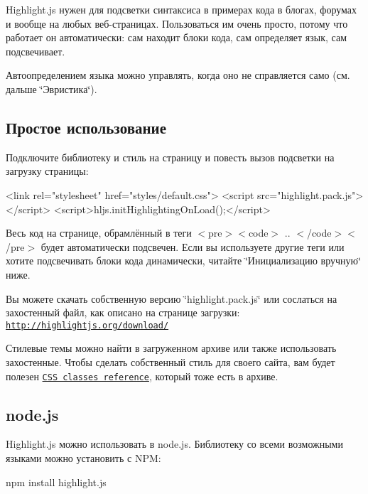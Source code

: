 Highlight.\+js нужен для подсветки синтаксиса в примерах кода в блогах, форумах и вообще на любых веб-\/страницах. Пользоваться им очень просто, потому что работает он автоматически\+: сам находит блоки кода, сам определяет язык, сам подсвечивает.

Автоопределением языка можно управлять, когда оно не справляется само (см. дальше \char`\"{}Эвристика\char`\"{}).

\subsection*{Простое использование}

Подключите библиотеку и стиль на страницу и повесть вызов подсветки на загрузку страницы\+:


\begin{DoxyCode}
<link rel="stylesheet" href="styles/default.css">
<script src="highlight.pack.js"></script>
<script>hljs.initHighlightingOnLoad();</script>
\end{DoxyCode}


Весь код на странице, обрамлённый в теги {\ttfamily $<$pre$>$$<$code$>$ .. $<$/code$>$$<$/pre$>$} будет автоматически подсвечен. Если вы используете другие теги или хотите подсвечивать блоки кода динамически, читайте \char`\"{}Инициализацию вручную\char`\"{} ниже.


\begin{DoxyItemize}
\item Вы можете скачать собственную версию \char`\"{}highlight.\+pack.\+js\char`\"{} или сослаться на захостенный файл, как описано на странице загрузки\+: \href{http://highlightjs.org/download/}{\tt http\+://highlightjs.\+org/download/}
\item Стилевые темы можно найти в загруженном архиве или также использовать захостенные. Чтобы сделать собственный стиль для своего сайта, вам будет полезен \href{http://highlightjs.readthedocs.org/en/latest/css-classes-reference.html}{\tt C\+SS classes reference}, который тоже есть в архиве.
\end{DoxyItemize}

\subsection*{node.\+js}

Highlight.\+js можно использовать в node.\+js. Библиотеку со всеми возможными языками можно установить с N\+PM\+: \begin{DoxyVerb}npm install highlight.js
\end{DoxyVerb}


